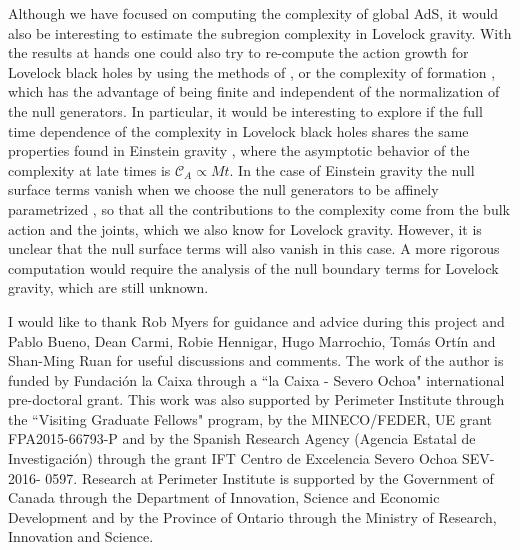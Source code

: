\documentclass[11pt,letterpaper]{article}
\begin{document}
Although we have focused on computing the complexity of global AdS, it would also be interesting to estimate the subregion complexity \cite{Carmi:2016wjl} in Lovelock gravity. 
With the results at hands one could also try to re-compute the action growth for Lovelock black holes \cite{Cai:2016xho} by using the methods of \cite{Lehner:2016vdi, Carmi:2017jqz}, or the complexity of formation \cite{Chapman:2016hwi}, which has the advantage of being finite and independent of the normalization of the null generators. In particular, it would be interesting to explore if the full time dependence of the complexity in Lovelock black holes shares the same properties found in Einstein gravity \cite{Brown:2015lvg,Carmi:2017jqz}, where the asymptotic behavior of the complexity at late times is $\mathcal{C}_A\propto M t$. In the case of Einstein gravity the null surface terms vanish when we choose the null generators to be affinely parametrized \cite{Lehner:2016vdi}, so that all the contributions to the complexity come from the bulk action and the joints, which we also know for Lovelock gravity. However, it is unclear that the null surface terms will also vanish in this case. A more rigorous computation would require the analysis of the null boundary terms for Lovelock gravity, which are still unknown.



\acknowledgments
I would like to thank Rob Myers for guidance and advice during this project and Pablo Bueno, Dean Carmi, Robie Hennigar, Hugo Marrochio, Tom\'as Ort\'in and Shan-Ming Ruan for useful discussions and comments. The work of the author is funded by Fundaci\'on la Caixa through a ``la Caixa - Severo Ochoa" international pre-doctoral grant. This work was also supported by Perimeter Institute through the ``Visiting Graduate Fellows" program, by the MINECO/FEDER, UE grant FPA2015-66793-P and by the Spanish Research Agency (Agencia Estatal de Investigaci\'on) through the grant IFT Centro de Excelencia Severo Ochoa SEV-2016- 0597. Research at Perimeter Institute is supported by the Government of Canada through the Department of Innovation, Science and Economic Development and by the Province of Ontario through the Ministry of Research, Innovation and Science.

\appendix
\end{document}
